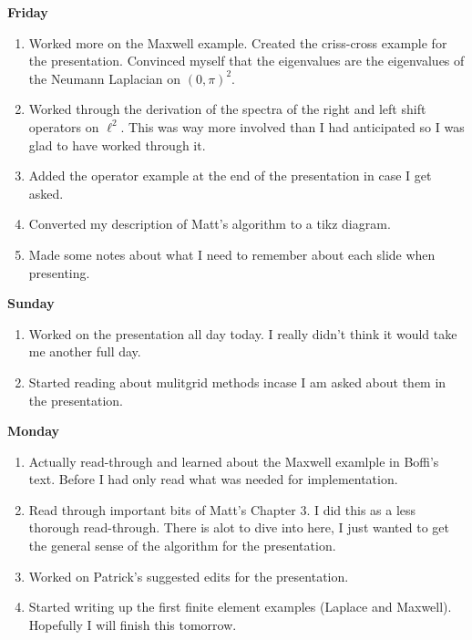 \documentclass[12pt,a4paper]{article}
\begin{document}
\textbf{Friday}
\begin{enumerate}
    \item Worked more on the Maxwell example. Created the criss-cross example for the presentation. Convinced myself that the eigenvalues are the eigenvalues of the Neumann Laplacian on $(0, \pi)^2.$
    \item Worked through the derivation of the spectra of the right and left shift operators on $\ell^2.$ This was way more involved than I had anticipated so I was glad to have worked through it.
    \item Added the operator example at the end of the presentation in case I get asked. 
    \item Converted my description of Matt's algorithm to a tikz diagram.
    \item Made some notes about what I need to remember about each slide when presenting. 
\end{enumerate}


\textbf{Sunday}
\begin{enumerate}
\item Worked on the presentation all day today. I really didn't think it would take me another full day. 
\item Started reading about mulitgrid methods incase I am asked about them in the presentation. 
\end{enumerate}

\textbf{Monday}
\begin{enumerate}
\item Actually read-through and learned about the Maxwell examlple in Boffi's text. Before I had only read what was needed for implementation.  
\item Read through important bits of Matt's Chapter 3. I did this as a less thorough read-through. There is alot to dive into here, I just wanted to get the general sense of the algorithm for the presentation. 
\item Worked on Patrick's suggested edits for the presentation. 
\item Started writing up the first finite element examples (Laplace and Maxwell). Hopefully I will finish this tomorrow. 
\end{enumerate}
\end{document}
